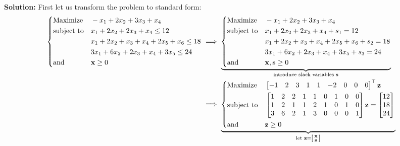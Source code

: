 \documentclass{article}
\newcommand{\icol}[1]{%
  \begin{bsmallmatrix}#1\end{bsmallmatrix}%
}
\renewcommand\vec{\mathbf}
\begin{document}
\noindent\textbf{Solution:} First let us transform the problem to standard form:
\begin{align*}
    \left\{\begin{aligned}
        &{\text{Maximize}}
        &&-x_1+2x_2+3x_3+x_4\\
        &{\text{subject to}}
        &&x_1+2x_2+2x_3+x_4\le12\\
        &
        &&x_1+2x_2+x_3+x_4+2x_5+x_6\le18\\
        &
        &&3x_1+6x_2+2x_3+x_4+3x_5\le24\\
        &{\text{and}}
        &&\vec x\ge 0
    \end{aligned}\right.
    &\implies
    \underbrace{\left\{\begin{aligned}
        &{\text{Maximize}}
        &&-x_1+2x_2+3x_3+x_4\\
        &{\text{subject to}}
        &&x_1+2x_2+2x_3+x_4+s_1=12\\
        &
        &&x_1+2x_2+x_3+x_4+2x_5+x_6+s_2=18\\
        &
        &&3x_1+6x_2+2x_3+x_4+3x_5+s_3=24\\
        &{\text{and}}
        &&\vec x,\vec s\ge 0
    \end{aligned}\right.}_{\text{introduce slack variables } \vec s}\\
    &\implies
    \underbrace{\left\{\begin{aligned}
        &{\text{Maximize}}
        &&\begin{bmatrix}
            -1&2&3&1&1&-2&0&0&0
        \end{bmatrix}^\top\vec z\\
        &{\text{subject to}}
        &&\begin{bmatrix}
            1&2&2&1&1&0&1&0&0\\
            1&2&1&1&2&1&0&1&0\\
            3&6&2&1&3&0&0&0&1
        \end{bmatrix}\vec z=\begin{bmatrix}
            12\\18\\24
        \end{bmatrix}\\
        &{\text{and}}
        &&\vec z\ge 0
    \end{aligned}\right.}_{\text{let }\vec z=\icol{\vec x\\\vec s}}
\end{align*}
\end{document}
